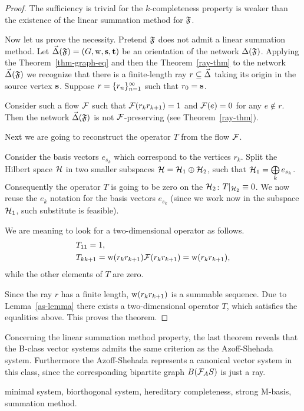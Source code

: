 \documentclass[12pt]{amsart}
\begin{document}
      \begin{proof}
        The sufficiency is trivial for the $k$-completeness property is weaker than the existence of the linear summation method
          for $\fsys$.

        Now let us prove the necessity.
        Pretend $\fsys$ does not admit a linear summation method.
        Let $\onet(\fsys) = (G, \wtp, \source, \sink)$ be an orientation of the network $\net(\fsys)$.
        Applying the Theorem~\ref{thm-graph-eq} and then the Theorem~\ref{ray-thm} to the network $\onet(\fsys)$
          we recognize that there is a finite-length ray $r \subseteq \onet$ taking its origin
          in the source vertex $\source$.
        Suppose $r = \seq{r}$ such that $r_0 = \source$.

        Consider such a flow $\flowpos$ such that $\flowpos(r_k r_{k+1}) = 1$ and $\flowpos(e) = 0$ for any $e \not \in r$.
        Then the network $\onet(\fsys)$ is not $\flowpos$-preserving (see Theorem~\ref{ray-thm}).

        Next we are going to reconstruct the operator $T$ from the flow $\flowpos$.

        Consider the basis vectors $e_{s_k}$ which correspond to the vertices $r_k$.
        Split the Hilbert space $\cal{H}$ in two smaller subspaces $\cal{H} = \cal{H}_1 \oplus \cal{H}_2$,
          such that $\cal{H}_1 = \bigoplus\limits_k e_{s_k}$.
        Consequently the operator $T$ is going to be zero on the $\cal{H}_2$: $T\vert_{\cal{H}_2} \equiv 0$.
        We now reuse the $e_k$ notation for the basis vectors $e_{s_k}$ (since we work now in the subspace $\cal{H}_1$,
          such substitute is feasible).

        We are meaning to look for a two-dimensional operator as follows.
        \begin{align*}
          &T_{11} = 1,\\
          &T_{k k+1} = \wtp(r_k r_{k+1}) \flowpos(r_k r_{k+1}) = \wtp(r_k r_{k+1}),
        \end{align*}
          while the other elements of $T$ are zero.

        Since the ray $r$ has a finite length, $\wtp(r_k r_{k+1})$ is a summable sequence.
        Due to Lemma~\ref{as-lemma} there exists a two-dimensional operator $T$, which satisfies the equalities above.
        This proves the theorem.
    \end{proof}
    \begin{remark}
      Concerning the linear summation method property, the last theorem reveals that the B-class vector systems
        admits the same criterion as the Azoff-Shehada system.
      Furthermore the Azoff-Shehada represents a canonical vector system in this class, since the corresponding bipartite graph $B(\cal{F}_AS)$
        is just a ray.
    \end{remark}
\bigskip

\vspace{1em}
 minimal system, biorthogonal system, hereditary completeness, strong M-basis, summation method.
\end{document}
